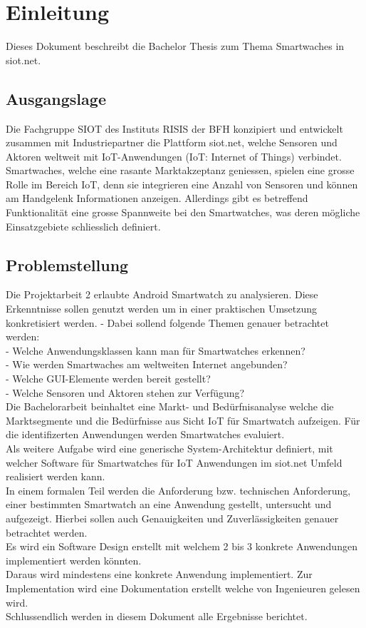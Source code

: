 \chapter{Einleitung}
Dieses Dokument beschreibt die Bachelor Thesis zum Thema Smartwaches in siot.net.

\section{Ausgangslage}
Die Fachgruppe SIOT des Instituts RISIS der BFH konzipiert und entwickelt zusammen mit Industriepartner die Plattform siot.net, welche Sensoren und Aktoren weltweit mit IoT-Anwendungen (IoT: Internet of Things) verbindet. Smartwaches, welche eine rasante Marktakzeptanz geniessen, spielen eine grosse Rolle im Bereich IoT, denn sie integrieren eine Anzahl von Sensoren und können am Handgelenk Informationen anzeigen. Allerdings gibt es betreffend Funktionalität eine grosse Spannweite bei den Smartwatches, was deren mögliche Einsatzgebiete schliesslich definiert.

\section{Problemstellung}
Die Projektarbeit 2 erlaubte Android Smartwatch zu analysieren. Diese Erkenntnisse sollen genutzt werden um in einer praktischen Umsetzung konkretisiert werden.
- Dabei sollend folgende Themen genauer betrachtet werden: \\
- Welche Anwendungsklassen kann man für Smartwatches erkennen? \\
- Wie werden Smartwaches am weltweiten Internet angebunden? \\
- Welche GUI-Elemente werden bereit gestellt? \\
- Welche Sensoren und Aktoren stehen zur Verfügung? \\

Die Bachelorarbeit beinhaltet eine Markt- und Bedürfnisanalyse welche die Marktsegmente und die Bedürfnisse aus Sicht IoT für Smartwatch aufzeigen. Für die identifizerten Anwendungen werden Smartwatches evaluiert.\\
Als weitere Aufgabe wird eine generische System-Architektur definiert, mit welcher Software für Smartwatches für IoT Anwendungen im siot.net Umfeld realisiert werden kann. \\
In einem formalen Teil werden die Anforderung bzw. technischen Anforderung, einer bestimmten Smartwatch an eine Anwendung gestellt, untersucht und aufgezeigt. Hierbei sollen auch Genauigkeiten und Zuverlässigkeiten genauer betrachtet werden. \\
Es wird ein Software Design erstellt mit welchem 2 bis 3 konkrete Anwendungen implementiert werden könnten. \\
Daraus wird mindestens eine konkrete Anwendung implementiert. Zur Implementation wird eine Dokumentation erstellt welche von Ingenieuren gelesen wird. \\
Schlussendlich werden in diesem Dokument alle Ergebnisse berichtet.

